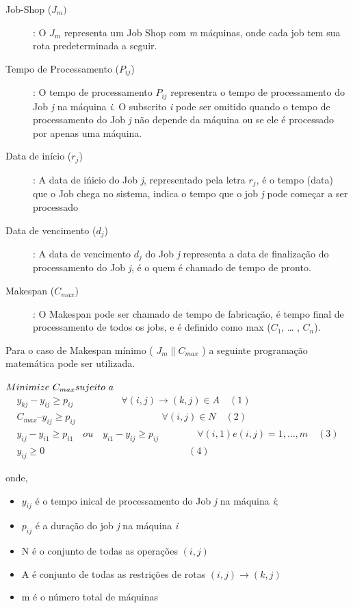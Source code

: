 \begin{description}

\item [Job-Shop ($J_{m})$]: O $J_m$ representa um Job Shop com {\it m} máquinas, onde cada job tem sua rota predeterminada a seguir.

\item [Tempo de Processamento ($P_{ij}$)]: O tempo de processamento $P_{ij}$ representra o tempo de processamento do Job {\it j} na máquina {\it i}. O subscrito {\it i} pode ser omitido quando o tempo de processamento do Job {\it j} não depende da máquina ou se ele é processado por apenas uma máquina.

\item [Data de início ($r_j$)]: A data de ińicio do Job {\it j}, representado pela letra $r_j$, é o tempo (data) que o Job chega no sistema, indica o tempo que o job {\it j} pode começar a ser processado

\item [Data de vencimento ($d_j$)]: A data de vencimento $d_j$ do Job {\it j} representa a data de finalização do processamento do Job {\it j}, é o quem é chamado de tempo de pronto.

\item [Makespan ($C_{max}$)]: O Makespan pode ser chamado de tempo de fabricação, é tempo final de processamento de todos os jobs, e é definido como max ($C_1$, … , $C_n$).
\end{description}

Para o caso de Makespan mínimo ( $J_m \parallel C_{max}$ ) a seguinte programação matemática pode ser utilizada.

$\\Minimize\ C_{max}\\ \\
sujeito\ a$
\begin{eqnarray*}
        y_{kj}-y_{ij}\geq p_{ij} \qquad \qquad \quad \forall (i,j) \rightarrow (k,j) \in A  \quad (1)\\
        C_{max} – y_{ij}\geq p_{ij} \qquad \qquad \qquad \qquad \quad \forall (i,j) \in N \quad (2)\\
        y_{ij}-y_{i1}\geq p_{i1}\quad ou \quad y_{i1}-y_{ij}\geq p_{ij} \qquad \qquad\forall(i,1) e (i,j) = 1, ..., m \quad (3) \\
         y_{ij}\geq 0 \qquad \qquad \quad \qquad \qquad \qquad \qquad \qquad (4)
\end{eqnarray*}

onde,
\begin{itemize}

\item $y_{ij}$ é o tempo inical de processamento do Job {\it j} na máquina {\it i};
\item $p_{ij}$ é a duração do job {\it j} na máquina {\it i}
\item N é o conjunto de todas as operações $(i,j)$
\item A é conjunto de todas as restrições de rotas $(i,j) \rightarrow (k,j)$
\item m é o número total de máquinas

\end{itemize}

